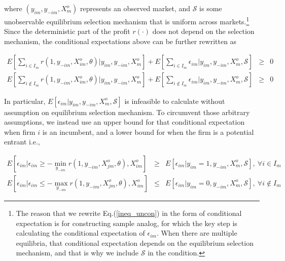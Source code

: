 \documentclass[draft]{article}
\begin{document}
where $(y_{im}, y_{-im}, X^o_{m})$ represents an observed market, and $\mathcal{S}$ is some unobservable equilibrium selection mechanism that is uniform across markets.\footnote{The reason that we rewrite Eq.(\ref{ineq_uncon}) in the form of conditional expectation is for constructing sample analog, for which the key step is calculating the conditional expectation of $\epsilon_{im}$. When there are multiple equilibria, that conditional expectation depends on the equilibrium selection mechanism, and that is why we include $\mathcal{S}$ in the condition.} Since the deterministic part of the profit $r(\cdot)$ does not depend on the selection mechanism, the conditional expectations above can be further rewritten as 


\begin{equation}
\begin{array}{rcl}
\displaystyle E[ \sum_{i \in I_m} r(1,y_{-im},X^o_{im},\theta)| y_{im}, y_{-im}, X^o_{m}]+ E[ \sum_{i \in I_m} \epsilon_{im} | y_{im}, y_{-im}, X^o_{m},\mathcal{S}] &\geq& 0 \\ 
\displaystyle  E[\sum_{i \not\in I_m} r(1,y_{-im},X^o_{im},\theta)| y_{im}, y_{-im}, X^o_{m}]+ E[\sum_{i \not\in I_m} \epsilon_{im} |y_{im}, y_{-im}, X^o_{m}, \mathcal{S}] &\geq& 0
\end{array}
\label{ineq_con}
\end{equation}






In particular, $E[\epsilon_{im}|y_{im},y_{-im}, X^o_{m}, \mathcal{S}]$ is infeasible to calculate without assumption on equilibrium selection mechanism. To circumvent those arbitrary assumptions, we instead use an upper bound for that conditional expectation when firm $i$ is an incumbent, and a lower bound for when the firm is a potential entrant i.e.,

\begin{equation}
\begin{array}{rcl}
\displaystyle E[\epsilon_{im}|\epsilon_{im} \geq - \min_{y_{-im}}r(1,y_{-im},X^o_{jm},\theta), X^o_{im}] & \geq & \displaystyle E[\epsilon_{im}|y_{im} = 1, y_{-im}, X^o_{m}, \mathcal{S}], \ \forall i \in I_m  \\
\displaystyle E[\epsilon_{im}|\epsilon_{im} \leq - \max_{y_{-im}}r(1,y_{-im},X^o_{jm},\theta), X^o_{im}] & \leq & \displaystyle E[\epsilon_{im}|y_{im} = 0, y_{-im}, X^o_{m}, \mathcal{S}], \ \forall i \not\in I_m 
\end{array}
\label{ineq_bound}
\end{equation}
\end{document}
